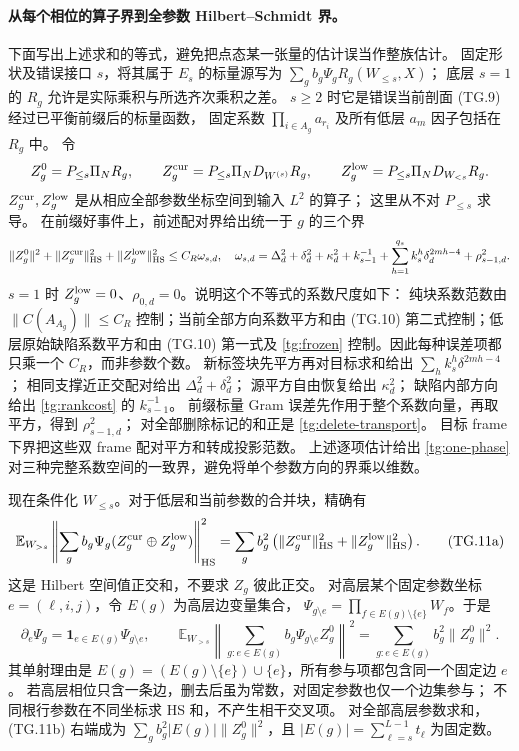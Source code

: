 \documentclass[a4paper]{tufte-handout}
\begin{document}
\begin{fullwidth}
\paragraph{从每个相位的算子界到全参数 Hilbert--Schmidt 界。}
下面写出上述求和的等式，避免把点态某一张量的估计误当作整族估计。
固定形状及错误接口 $s$，将其属于 $E_s$ 的标量源写为
$\sum_g b_g\Psi_g R_g(W_{\le s},X)$；
底层 $s=1$ 的 $R_g$ 允许是实际乘积与所选齐次乘积之差。
$s\ge2$ 时它是错误当前剖面 (TG.9) 经过已平衡前缀后的标量函数，
固定系数 $\prod_{i\in A_g}a_{r_i}$ 及所有低层 $a_m$ 因子包括在 $R_g$ 中。
令
\[
 Z_g^0=P_{\le s}\Pi_NR_g,\qquad
 Z_g^{\rm cur}=P_{\le s}\Pi_ND_{W^{(s)}}R_g,\qquad
 Z_g^{\rm low}=P_{\le s}\Pi_ND_{W_{<s}}R_g.
\]
$Z_g^{\rm cur},Z_g^{\rm low}$ 是从相应全部参数坐标空间到输入 $L^2$ 的算子；
这里从不对 $P_{\le s}$ 求导。
在前缀好事件上，前述配对界给出统一于 $g$ 的三个界
\begin{equation}\label{tg:one-phase}
 \|Z_g^0\|^2+\|Z_g^{\rm cur}\|_{\rm HS}^2+
 \|Z_g^{\rm low}\|_{\rm HS}^2\le C_R\omega_{s,d},\quad
 \omega_{s,d}=\Delta_d^2+\delta_d^2+\kappa_d^2+k_{s-1}^{-1}
 +\sum_{h=1}^{q_s}k_s^h\delta_d^{2mh-4}+\rho_{s-1,d}^2.
\end{equation}
$s=1$ 时 $Z_g^{\rm low}=0$、$\rho_{0,d}=0$。说明这个不等式的系数尺度如下：
纯块系数范数由 $\|C(A_{A_g})\|\le C_R$ 控制；当前全部方向系数平方和由
(TG.10) 第二式控制；低层原始缺陷系数平方和由 (TG.10) 第一式及
\eqref{tg:frozen} 控制。因此每种误差项都只乘一个 $C_R$，而非参数个数。
新标签块先平方再对目标求和给出 $\sum_hk_s^h\delta^{2mh-4}$；
相同支撑近正交配对给出 $\Delta_d^2+\delta_d^2$；
源平方自由恢复给出 $\kappa_d^2$；
缺陷内部方向给出 \eqref{tg:rankcost} 的 $k_{s-1}^{-1}$。
前缀标量 Gram 误差先作用于整个系数向量，再取平方，得到 $\rho_{s-1,d}^2$；
对全部删除标记的和正是 \eqref{tg:delete-transport}。
目标 frame 下界把这些双 frame 配对平方和转成投影范数。
上述逐项估计给出 \eqref{tg:one-phase} 对三种完整系数空间的一致界，避免将单个参数方向的界乘以维数。

现在条件化 $W_{\le s}$。对于低层和当前参数的合并块，精确有
\[
 \mathbb E_{W_{>s}}\left\|\sum_gb_g\Psi_g
       (Z_g^{\rm cur}\oplus Z_g^{\rm low})\right\|_{\rm HS}^2
 =\sum_gb_g^2\left(\|Z_g^{\rm cur}\|_{\rm HS}^2+\|Z_g^{\rm low}\|_{\rm HS}^2\right).
 \tag{TG.11a}
\]
这是 Hilbert 空间值正交和，不要求 $Z_g$ 彼此正交。
对高层某个固定参数坐标 $e=(\ell,i,j)$，令 $E(g)$ 为高层边变量集合，
$\Psi_{g\setminus e}=\prod_{f\in E(g)\setminus\{e\}}W_f$。于是
\[
 \partial_e\Psi_g=\mathbf1_{e\in E(g)}\Psi_{g\setminus e},\qquad
 \mathbb E_{W_{>s}}\left\|\sum_{g:e\in E(g)}b_g\Psi_{g\setminus e}Z_g^0\right\|^2
 =\sum_{g:e\in E(g)}b_g^2\|Z_g^0\|^2.\tag{TG.11b}
\]
其单射理由是 $E(g)=(E(g)\setminus\{e\})\cup\{e\}$，所有参与项都包含同一个固定边 $e$。
若高层相位只含一条边，删去后虽为常数，对固定参数也仅一个边集参与；
不同根行参数在不同坐标求 HS 和，不产生相干交叉项。
对全部高层参数求和，(TG.11b) 右端成为
$\sum_g b_g^2|E(g)|\|Z_g^0\|^2$，且 $|E(g)|=\sum_{\ell=s}^{L-1}t_\ell$ 为固定数。


\end{fullwidth}
\end{document}
